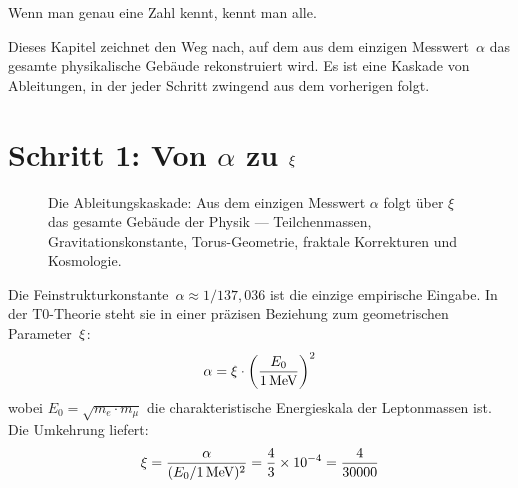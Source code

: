 \epigraph{Wenn man genau eine Zahl kennt, kennt man alle.}{}

Dieses Kapitel zeichnet den Weg nach, auf dem aus dem einzigen Messwert~$\alpha$ das gesamte physikalische Gebäude rekonstruiert wird. Es ist eine Kaskade von Ableitungen, in der jeder Schritt zwingend aus dem vorherigen folgt.

\section{Schritt 1: Von $\alpha$ zu $\xi$}


\begin{figure}[ht]
\centering
{}
\caption{Die Ableitungskaskade: Aus dem einzigen Messwert $\alpha$ folgt über $\xi$ das gesamte Gebäude der Physik --- Teilchenmassen, Gravitationskonstante, Torus-Geometrie, fraktale Korrekturen und Kosmologie.}
\label{fig:ableitungskette}
\end{figure}
Die Feinstrukturkonstante~$\alpha \approx 1/137{,}036$ ist die einzige empirische Eingabe. In der T0-Theorie steht sie in einer präzisen Beziehung zum geometrischen Parameter~$\xi$:
\begin{equation}
\alpha = \xi \cdot \left(\frac{E_0}{1\,\text{MeV}}\right)^2
\end{equation}
wobei $E_0 = \sqrt{m_e \cdot m_\mu}$ die charakteristische Energieskala der Leptonmassen ist. Die Umkehrung liefert:
\begin{equation}
\xi = \frac{\alpha}{(E_0/1\,\text{MeV})^2} = \frac{4}{3} \times 10^{-4} = \frac{4}{30000}
\end{equation}

